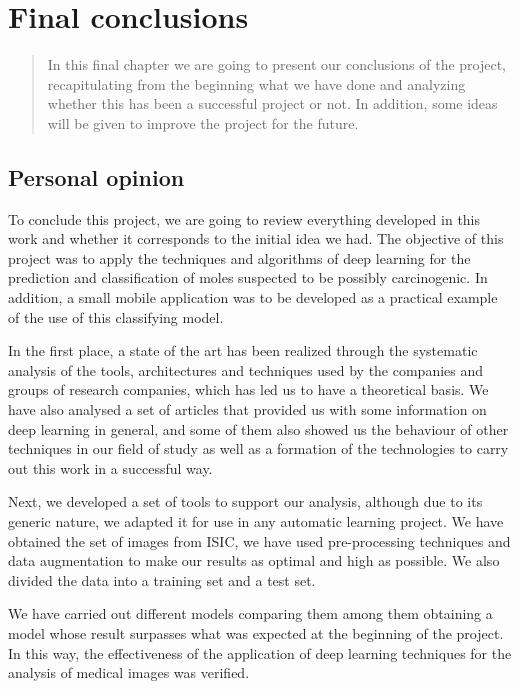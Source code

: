 \chapter{Final conclusions}

\begin{abstract}
In this final chapter we are going to present our conclusions of the project, recapitulating from the beginning what we have done and analyzing whether this has been a successful project or not. In addition, some ideas will be given to improve the project for the future.
\end{abstract}

\section{Personal opinion}

To conclude this project, we are going to review everything developed in this work and whether it corresponds to the initial idea we had. The objective of this project was to apply the techniques and algorithms of deep learning for the prediction and classification of moles suspected to be possibly carcinogenic. In addition, a small mobile application was to be developed as a practical example of the use of this classifying model. 

In the first place, a state of the art has been realized through the systematic analysis of the tools, architectures and techniques used by the companies and groups of research companies, which has led us to have a theoretical basis. We have also analysed a set of articles that provided us with some information on deep learning in general, and some of them also showed us the behaviour of other techniques in our field of study as well as a formation of the technologies to carry out this work in a successful way.

Next, we developed a set of tools to support our analysis, although due to its generic nature, we adapted it for use in any automatic learning project.  We have obtained the set of images from ISIC, we have used pre-processing techniques and data augmentation to make our results as optimal and high as possible. We also divided the data into a training set and a test set.

We have carried out different models comparing them among them obtaining a model whose result surpasses what was expected at the beginning of the project. In this way, the effectiveness of the application of deep learning techniques for the analysis of medical images was verified.

